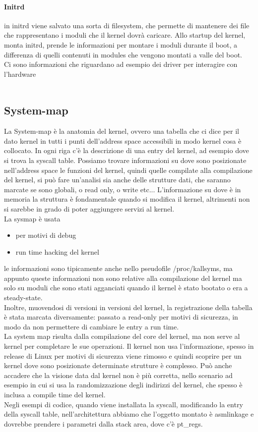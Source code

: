 \documentclass[12pt, oneside]{extbook}
\begin{document}
\paragraph{Initrd} in initrd viene salvato una sorta di filesystem, che permette di mantenere dei file che rappresentano i moduli che il kernel dovrà caricare. Allo startup del kernel, monta initrd, prende le informazioni per montare i moduli durante il boot, a differenza di quelli contenuti in modules che vengono montati a valle del boot.\\ Ci sono informazioni che riguardano ad esempio dei driver per interagire con l'hardware\\\\
\subsection{System-map}
La System-map è la anatomia del kernel, ovvero una tabella che ci dice per il dato kernel in tutti i punti dell'address space accessibili in modo kernel cosa è collocato. In ogni riga c'è la descrizione di una entry del kernel, ad esempio dove si trova la syscall table. Possiamo trovare informazioni su dove sono posizionate nell'address space le funzioni del kernel, quindi quelle compilate alla compilazione del kernel, si può fare un'analisi sia anche delle strutture dati, che saranno marcate se sono globali, o read only, o write etc... L'informazione su dove è in memoria la struttura è fondamentale quando si modifica il kernel, altrimenti non si sarebbe in grado di poter aggiungere servizi al kernel.\\ La sysmap è usata
\begin{itemize}
\item per motivi di debug
\item run time hacking del kernel
\end{itemize}
le informazioni sono tipicamente anche nello pseudofile /proc/kallsyms, ma appunto queste informazioni non sono relative alla compilazione del kernel ma solo su moduli che sono stati agganciati quando il kernel è stato bootato o era a steady-state.\\ Inoltre, muovendosi di versioni in versioni del kernel, la registrazione della tabella è stata marcata diversamente: passato a read-only per motivi di sicurezza, in modo da non permettere di cambiare le entry a run time.\\ La system map risulta dalla compilazione del core del kernel, ma non serve al kernel per completare le sue operazioni. Il kernel non usa l'informazione, spesso in release di Linux per motivi di sicurezza viene rimosso e quindi scoprire per un kernel dove sono posizionate determinate strutture è complesso. Può anche accadere che la visione data dal kernel non è più corretta, nello scenario ad esempio in cui si usa la randomizzazione degli indirizzi del kernel, che spesso è inclusa a compile time del kernel.\\ Negli esempi di codice, quando viene installata la syscall, modificando la entry della syscall table, nell'architettura abbiamo che l'oggetto montato è asmlinkage e dovrebbe prendere i parametri dalla stack area, dove c'è pt\_regs.
\end{document}
